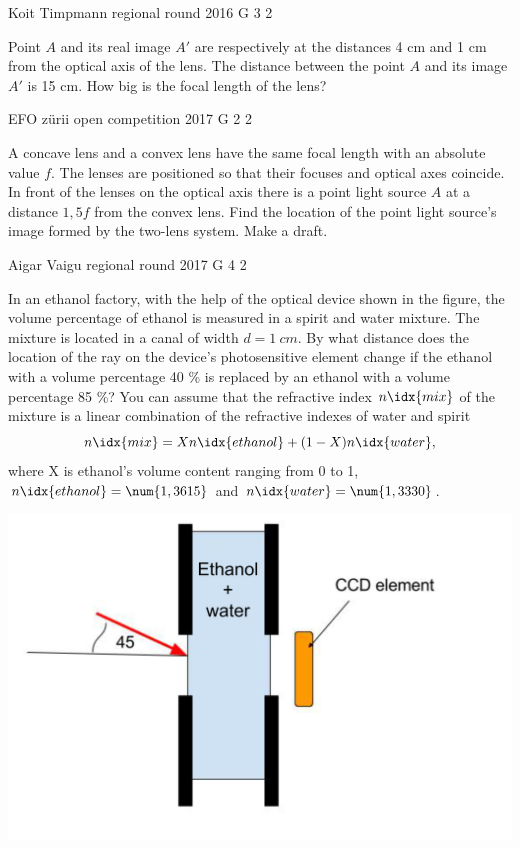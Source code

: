 \documentclass[11pt]{article}
\begin{document}
{Koit Timpmann} %
{regional round} %
{2016} %
{G 3} %
{2} %
{

\ifEngStatement
Point $A$ and its real image $A'$ are respectively at the distances 4 cm and 1 cm from the optical axis of the lens. The distance between the point $A$ and its image $A'$ is 15 cm. How big is the focal length of the lens?
\fi
}

{EFO zürii} %
{open competition} %
{2017} %
{G 2} %
{2} %
{

\ifEngStatement
A concave lens and a convex lens have the same focal length with an absolute value $f$. The lenses are positioned so that their focuses and optical axes coincide. In front of the lenses on the optical axis there is a point light source $A$ at a distance $1,5f$ from the convex lens. Find the location of the point light source's image formed by the two-lens system. Make a draft.
\fi
}

{Aigar Vaigu} %
{regional round} %
{2017} %
{G 4} %
{2} %
{

\ifEngStatement
In an ethanol factory, with the help of the optical device shown in the figure, the volume percentage of ethanol is measured in a spirit and water mixture. The mixture is located in a canal of width $d=\SI{1}{cm}$. By what distance does the location of the ray on the device's photosensitive element change if the ethanol with a volume percentage 40 \% is replaced by an ethanol with a volume percentage 85 \%? You can assume that the refractive index $n\idx{mix}$ of the mixture is a linear combination of the refractive indexes of water and spirit
$$
n\idx{mix}=Xn\idx{ethanol}+(1-X)n\idx{water},
$$
where X is ethanol’s volume content ranging from 0 to 1, $n\idx{ethanol}=\num{1,3615}$ and $n\idx{water}=\num{1,3330}$.
\begin{center}
	\vspace{-0pt}
	\includegraphics[width=0.5\linewidth]{2017-v2g-04-Piiritusetehas_ing}
	\vspace{-10pt}
\end{center}
\fi
}
\end{document}
